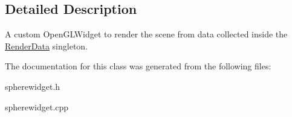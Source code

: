 \subsection{Detailed Description}
A custom Open\+G\+L\+Widget to render the scene from data collected inside the \hyperlink{class_render_data}{Render\+Data} singleton. 

The documentation for this class was generated from the following files\+:\begin{DoxyCompactItemize}
\item 
spherewidget.\+h\item 
spherewidget.\+cpp\end{DoxyCompactItemize}
